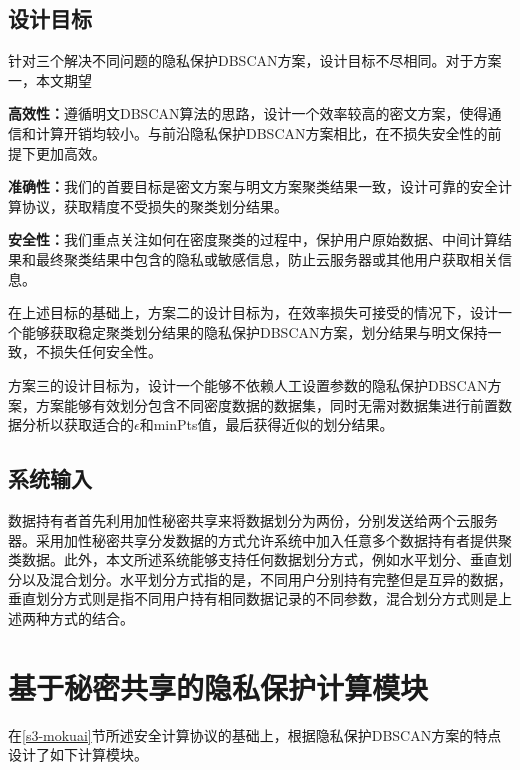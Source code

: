 \subsection{设计目标}
针对三个解决不同问题的隐私保护DBSCAN方案，设计目标不尽相同。对于方案一，本文期望
\begin{compactitem}
	\item\textbf{高效性：}遵循明文DBSCAN算法的思路，设计一个效率较高的密文方案，使得通信和计算开销均较小。与前沿隐私保护DBSCAN方案相比，在不损失安全性的前提下更加高效。
	\item\textbf{准确性：}我们的首要目标是密文方案与明文方案聚类结果一致，设计可靠的安全计算协议，获取精度不受损失的聚类划分结果。
	\item\textbf{安全性：}我们重点关注如何在密度聚类的过程中，保护用户原始数据、中间计算结果和最终聚类结果中包含的隐私或敏感信息，防止云服务器或其他用户获取相关信息。
\end{compactitem}

在上述目标的基础上，方案二的设计目标为，在效率损失可接受的情况下，设计一个能够获取稳定聚类划分结果的隐私保护DBSCAN方案，划分结果与明文保持一致，不损失任何安全性。

方案三的设计目标为，设计一个能够不依赖人工设置参数的隐私保护DBSCAN方案，方案能够有效划分包含不同密度数据的数据集，同时无需对数据集进行前置数据分析以获取适合的$\epsilon$和minPts值，最后获得近似的划分结果。

\subsection{系统输入}
数据持有者首先利用加性秘密共享来将数据划分为两份，分别发送给两个云服务器。采用加性秘密共享分发数据的方式允许系统中加入任意多个数据持有者提供聚类数据。此外，本文所述系统能够支持任何数据划分方式，例如水平划分、垂直划分以及混合划分。水平划分方式指的是，不同用户分别持有完整但是互异的数据\cite{gheid2016efficient}，垂直划分方式则是指不同用户持有相同数据记录的不同参数\cite{doganay2008distributed}，混合划分方式则是上述两种方式的结合\cite{yu2010multi}。
\section{基于秘密共享的隐私保护计算模块}
\label{s4-subpro}
在\ref{s3-mokuai}节所述安全计算协议的基础上，根据隐私保护DBSCAN方案的特点设计了如下计算模块。
